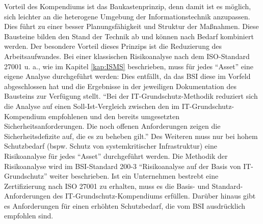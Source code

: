 Vorteil des Kompendiums ist das Baukastenprinzip, denn damit ist es möglich, sich leichter an die heterogene Umgebung der Informationstechnik anzupassen. Dies führt zu einer besser Planungsfähigkeit und Struktur der Maßnahmen.\autocite[vgl.][S.\,2]{bundesamt_fur_sicherheit_in_der_informationstechnik_bsi_it-grundschutz-kompendium_2020} Diese Bausteine bilden den Stand der Technik ab und können nach Bedarf kombiniert werden. Der besondere Vorteil dieses Prinzips ist die Reduzierung des Arbeitsaufwandes. Bei einer klassischen Risikoanalyse nach dem ISO-Standard 27001 u. a., wie im Kapitel \vref{kap:ISMS} beschrieben, muss für jedes \enquote{Asset} eine eigene Analyse durchgeführt werden: Dies entfällt, da das \ac{BSI} diese im Vorfeld abgeschlossen hat und die Ergebnisse in der jeweiligen Dokumentation des Bausteins zur Verfügung stellt. \enquote{Bei der IT-Grundschutz-Methodik reduziert sich die Analyse auf einen Soll-Ist-Vergleich zwischen den im IT-Grundschutz-Kompendium empfohlenen und den bereits umgesetzten Sicherheitsanforderungen. Die noch offenen Anforderungen zeigen die Sicherheitsdefizite auf, die es zu beheben gilt.}\autocite[][S.\,3]{bundesamt_fur_sicherheit_in_der_informationstechnik_bsi_it-grundschutz-kompendium_2020} Des Weiteren muss nur bei hohem Schutzbedarf (bspw. Schutz von systemkritischer Infrastruktur) eine Risikoanalyse für jedes \enquote{Asset} durchgeführt werden. Die Methodik der Risikoanalyse wird im BSI-Standard 200-3 \enquote{Risikoanalyse auf der Basis von IT-Grundschutz} weiter beschrieben. Ist ein Unternehmen bestrebt eine Zertifizierung nach ISO 27001 zu erhalten, muss es die Basis- und Standard-Anforderungen des IT-Grundschutz-Kompendiums erfüllen. Darüber hinaus gibt es Anforderungen für einen erhöhten Schutzbedarf, die vom \ac{BSI} ausdrücklich empfohlen sind.\autocite[vgl.][S.\,3]{bundesamt_fur_sicherheit_in_der_informationstechnik_bsi_it-grundschutz-kompendium_2020} 
\par
